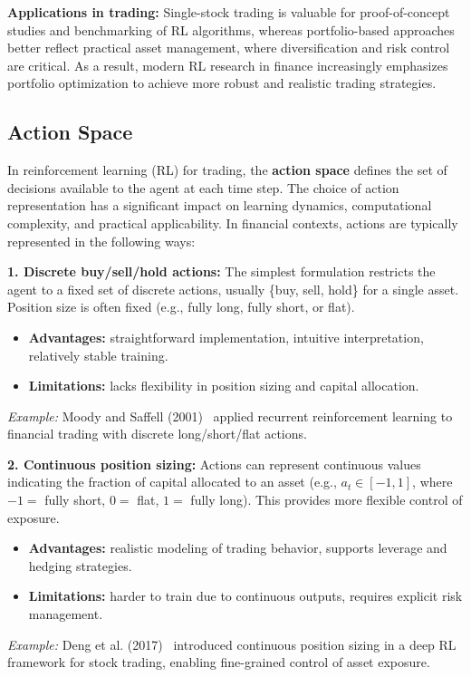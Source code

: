 \documentclass[12pt,a4paper]{report}
\begin{document}
\bigskip
\textbf{Applications in trading:}  
Single-stock trading is valuable for proof-of-concept studies and benchmarking of RL algorithms, whereas portfolio-based approaches better reflect practical asset management, where diversification and risk control are critical. As a result, modern RL research in finance increasingly emphasizes portfolio optimization to achieve more robust and realistic trading strategies.

\subsection{Action Space}

In reinforcement learning (RL) for trading, the \textbf{action space} defines the set of decisions available to the agent at each time step. The choice of action representation has a significant impact on learning dynamics, computational complexity, and practical applicability. In financial contexts, actions are typically represented in the following ways:

\bigskip
\textbf{1. Discrete buy/sell/hold actions:}  
The simplest formulation restricts the agent to a fixed set of discrete actions, usually \{buy, sell, hold\} for a single asset. Position size is often fixed (e.g., fully long, fully short, or flat).  
\begin{itemize}
    \item \textbf{Advantages:} straightforward implementation, intuitive interpretation, relatively stable training.
    \item \textbf{Limitations:} lacks flexibility in position sizing and capital allocation.
\end{itemize}
\textit{Example:} Moody and Saffell (2001)~\cite{moody2001learning} applied recurrent reinforcement learning to financial trading with discrete long/short/flat actions.

\bigskip
\textbf{2. Continuous position sizing:}  
Actions can represent continuous values indicating the fraction of capital allocated to an asset (e.g., $a_t \in [-1,1]$, where $-1 =$ fully short, $0 =$ flat, $1 =$ fully long). This provides more flexible control of exposure.  
\begin{itemize}
    \item \textbf{Advantages:} realistic modeling of trading behavior, supports leverage and hedging strategies.
    \item \textbf{Limitations:} harder to train due to continuous outputs, requires explicit risk management.
\end{itemize}
\textit{Example:} Deng et al. (2017)~\cite{deng2017deep} introduced continuous position sizing in a deep RL framework for stock trading, enabling fine-grained control of asset exposure.
\end{document}
